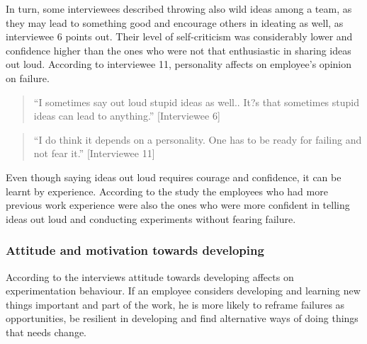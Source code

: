 In turn, some interviewees described throwing also wild ideas among a team, as they may lead to something good and encourage others in ideating as well, as interviewee 6 points out. Their level of self-criticism was considerably lower and confidence higher than the ones who were not that enthusiastic in sharing ideas out loud. According to interviewee 11, personality affects on employee's opinion on failure. 
\begin{quote}
 ``I sometimes say out loud stupid ideas as well.. It?s that sometimes stupid ideas can lead to anything.'' [Interviewee 6]
\end{quote}
\begin{quote}
``I do think it depends on a personality. One has to be ready for failing and not fear it.'' [Interviewee 11]
\end{quote}
Even though saying ideas out loud requires courage and confidence, it can be learnt by experience. According to the study the employees who had more previous work experience were also the ones who were more confident in telling ideas out loud and conducting experiments without fearing failure.

\subsubsection{Attitude and motivation towards developing}
According to the interviews attitude towards developing affects on experimentation behaviour. If an employee considers developing and learning new things important and part of the work, he is more likely to reframe failures as opportunities, be resilient in developing and find alternative ways of doing things that needs change. 

